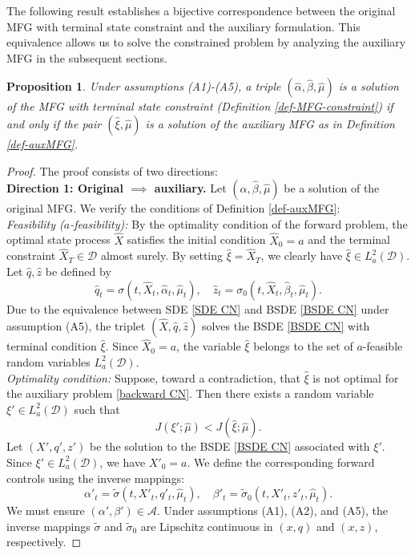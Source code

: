 \documentclass[11pt,a4paper]{article}
\newtheorem{prop}[theo]{Proposition}
\begin{document}
The following result establishes a bijective correspondence between the original MFG with terminal state constraint and the auxiliary formulation. This equivalence allows us to solve the constrained problem by analyzing the auxiliary MFG in the subsequent sections.
\begin{prop} 
\label{equivalence}
Under assumptions (A1)-(A5), a triple $(\hat \alpha, \hat \beta, \hat \mu)$ is a solution of the MFG with terminal state constraint  (Definition \ref{def-MFG-constraint}) if and only if the pair $(\hat \xi, \hat \mu)$ is a solution of the auxiliary MFG as in Definition \ref{def-auxMFG}.
\end{prop}
\begin{proof}
The proof consists of two directions:\\
\textbf{Direction 1: Original $\implies$ auxiliary.} 
Let $(\hat \alpha, \hat \beta, \hat \mu)$ be a solution of the original MFG. We verify the conditions of Definition \ref{def-auxMFG}:\\
 \textit{Feasibility ($a$-feasibility):} 
    By the optimality condition of the forward problem, the optimal state process $\hat X$ satisfies the initial condition $\hat X_0 = a$ and the terminal constraint $\hat X_T \in \mathcal{D}$ almost surely. By setting $\hat \xi = \hat X_T$, we clearly have $\hat \xi \in L^2_a(\mathcal{D})$. 
    Let $\hat q, \hat z$ be defined by
    \[ \hat q_t = \sigma(t, \hat X_t, \hat \alpha_t, \hat \mu_t), \quad \hat z_t = \sigma_0(t, \hat X_t, \hat \beta_t, \hat \mu_t). \]
    Due to the equivalence between SDE \eqref{SDE CN} and BSDE \eqref{BSDE CN} under assumption (A5), the triplet $(\hat X, \hat q, \hat z)$ solves the BSDE \eqref{BSDE CN} with terminal condition $\hat \xi$. Since $\hat X_0 = a$, the variable $\hat \xi$ belongs to the set of $a$-feasible random variables $L^2_a(\mathcal{D})$.\\
 \textit{Optimality condition:} 
    Suppose, toward a contradiction, that $\hat \xi$ is not optimal for the auxiliary problem \eqref{backward CN}. Then there exists a random variable $\xi' \in L^2_a(\mathcal{D})$ such that
    \begin{equation} \label{absurd_en}
    J(\xi'; \hat \mu) < J(\hat \xi; \hat \mu).
    \end{equation}
    Let $(X', q', z')$ be the solution to the BSDE \eqref{BSDE CN} associated with $\xi'$. Since $\xi' \in L^2_a(\mathcal{D})$, we have $X'_0 = a$. We define the corresponding forward controls using the inverse mappings:
    \begin{equation} \label{eq:inv-control} \alpha'_t = \tilde \sigma(t, X'_t, q'_t, \hat \mu_t), \quad \beta'_t = \tilde \sigma_0(t, X'_t, z'_t, \hat \mu_t). \end{equation}
    We must ensure $(\alpha', \beta') \in \mathcal{A}$. Under assumptions (A1), (A2), and (A5), the inverse mappings $\tilde \sigma$ and $\tilde \sigma_0$ are Lipschitz continuous in $(x, q)$ and $(x, z)$, respectively.
    

\end{proof}
\end{document}
